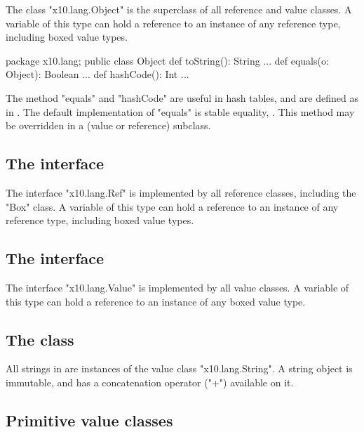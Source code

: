 The class \xcd"x10.lang.Object" is the superclass of all
reference and value classes.
A variable of this type can hold a reference to an instance of any
reference type, including boxed value types.

\begin{xten}
package x10.lang;
public class Object {
  def toString(): String {...}
  def equals(o: Object): Boolean {...}
  def hashCode(): Int {...}
}
\end{xten}

The method \xcd"equals" and \xcd"hashCode" are useful in hash tables,
and are defined as in \java. The default implementation of \xcd"equals"
is stable equality, . This method may be overridden
in a (value or reference) subclass.

\subsection{The interface }
\label{Ref}

The interface \xcd"x10.lang.Ref" is implemented by all reference
classes, including the \xcd"Box" class.
A variable of this type can hold a reference to an instance of any
reference type, including boxed value types.

\subsection{The interface }
\label{Value}

The interface \xcd"x10.lang.Value" is implemented by all value
classes.
A variable of this type can hold a reference to an instance of any
boxed value type.

\subsection{The class }
\label{String}

All strings in \Xten{} are instances of the value class
\xcd"x10.lang.String".
A string object is immutable,
and has a concatenation operator (\xcd"+") available on it.

\subsection{Primitive value classes}

